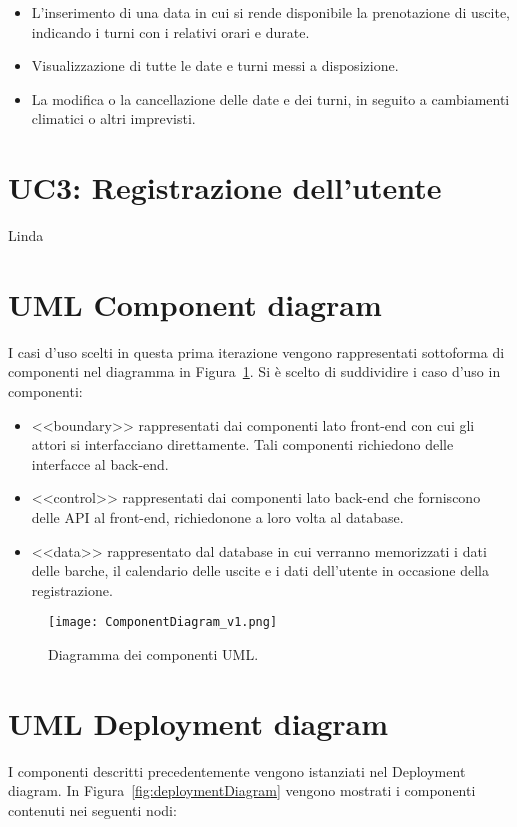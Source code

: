 \begin{itemize}
    \item L'inserimento di una data in cui si rende disponibile la prenotazione di uscite, indicando i turni con i relativi orari e durate.
    \item Visualizzazione di tutte le date e turni messi a disposizione.
    \item La modifica o la cancellazione delle date e dei turni, in seguito a cambiamenti climatici o altri imprevisti.
\end{itemize}

\section{UC3: Registrazione dell'utente}
Linda

\section{UML Component diagram}
I casi d'uso scelti in questa prima iterazione vengono rappresentati sottoforma di componenti nel diagramma in Figura~\ref{fig:componentDiagram}.
Si è scelto di suddividire i caso d'uso in componenti:

\begin{itemize}
    \item <<boundary>> rappresentati dai componenti lato front-end con cui gli attori si interfacciano direttamente. Tali componenti richiedono delle interfacce al back-end.
    \item <<control>> rappresentati dai componenti lato back-end che forniscono delle API al front-end, richiedonone a loro volta al database.
    \item <<data>> rappresentato dal database in cui verranno memorizzati i dati delle barche, il calendario delle uscite e i dati dell'utente in occasione della registrazione.
\end{itemize}

\begin{figure}[h]
    \centering
    \texttt{[image: ComponentDiagram\_v1.png]}
    \caption{Diagramma dei componenti UML.}\label{fig:componentDiagram}
\end{figure}

\section{UML Deployment diagram}
I componenti descritti precedentemente vengono istanziati nel Deployment diagram. In Figura~\ref{fig:deploymentDiagram} vengono mostrati i componenti contenuti nei seguenti nodi:

